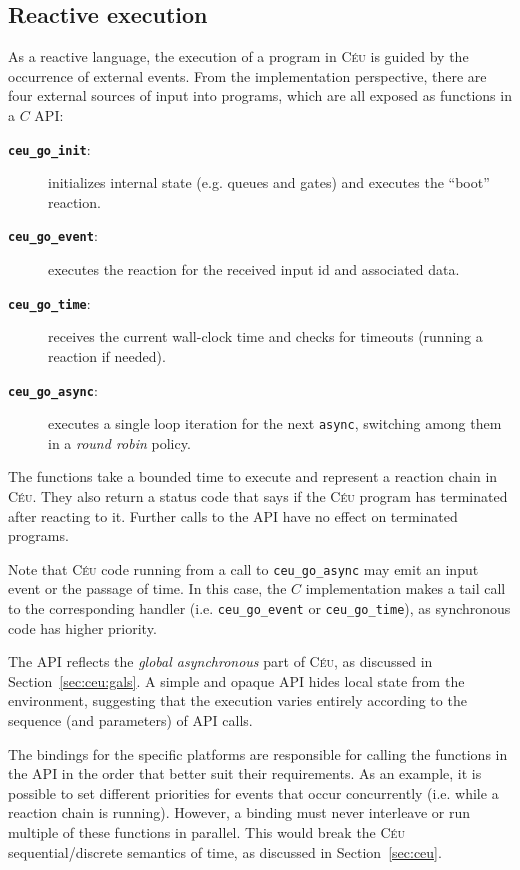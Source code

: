 \documentclass[11pt,a4paper]{article}
\newcommand{\2}{\;\;}
\newcommand{\5}{\;\;\;\;\;}
\newcommand{\CEU}{\textsc{C\'{e}u}}
\newcommand{\code}[1] {{\small{\texttt{#1}}}}
\begin{document}
\subsection{Reactive execution}

As a reactive language, the execution of a program in \CEU{} is guided by the 
occurrence of external events.
From the implementation perspective, there are four external sources of input 
into programs, which are all exposed as functions in a $C$ API:

\begin{description}
\item[{\textbf\code{ceu\_go\_init}}:] initializes internal state (e.g. queues 
and gates) and executes the ``boot'' reaction.

\item[{\textbf\code{ceu\_go\_event}}:] executes the reaction for the received 
input id and associated data.

\item[{\textbf\code{ceu\_go\_time}}:] receives the current wall-clock time and 
checks for timeouts (running a reaction if needed).

\item[{\textbf\code{ceu\_go\_async}}:] executes a single loop iteration for the
next \code{async}, switching among them in a \emph{round robin} policy.
\end{description}

The functions take a bounded time to execute and represent a reaction chain in 
\CEU{}.
They also return a status code that says if the \CEU{} program has terminated 
after reacting to it.
Further calls to the API have no effect on terminated programs.

Note that \CEU{} code running from a call to \code{ceu\_go\_async} may emit an 
input event or the passage of time.
In this case, the $C$ implementation makes a tail call to the corresponding 
handler (i.e.  \code{ceu\_go\_event} or \code{ceu\_go\_time}), as synchronous 
code has higher priority.

The API reflects the \emph{global asynchronous} part of \CEU{}, as discussed in 
Section~\ref{sec:ceu:gals}.
A simple and opaque API hides local state from the environment, suggesting that 
the execution varies entirely according to the sequence (and parameters) of API 
calls.

The bindings for the specific platforms are responsible for calling the 
functions in the API in the order that better suit their requirements.
As an example, it is possible to set different priorities for events that occur 
concurrently (i.e. while a reaction chain is running).
However, a binding must never interleave or run multiple of these functions in 
parallel.
This would break the \CEU{} sequential/discrete semantics of time, as discussed 
in Section~\ref{sec:ceu}.
\end{document}
